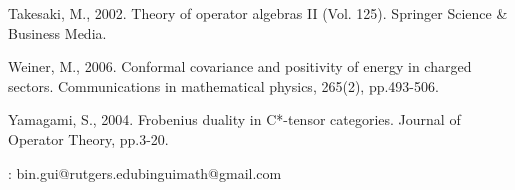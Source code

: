 \documentclass[12pt,a4paper]{article}
\theoremstyle{definition}
\theoremstyle{plain}
\numberwithin{equation}{section}
\begin{document}
\begin{thebibliography}{99999}
Takesaki, M., 2002. Theory of operator algebras II (Vol. 125). Springer Science \& Business Media.

Weiner, M., 2006. Conformal covariance and positivity of energy in charged sectors. Communications in mathematical physics, 265(2), pp.493-506.



Yamagami, S., 2004. Frobenius duality in C*-tensor categories. Journal of Operator Theory, pp.3-20.





	

	
\end{thebibliography}

: bin.gui@rutgers.edu\qquad binguimath@gmail.com
\end{document}
